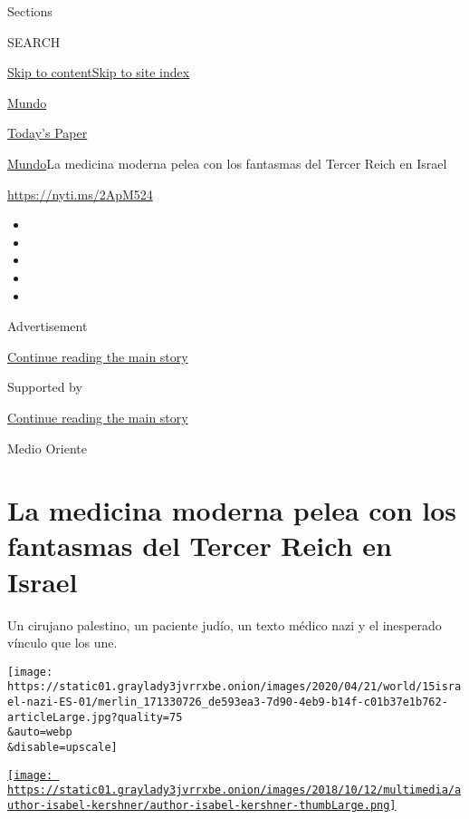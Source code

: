 Sections

SEARCH

\protect\hyperlink{site-content}{Skip to
content}\protect\hyperlink{site-index}{Skip to site index}

\href{https://www.nytimes3xbfgragh.onion/es/section/mundo}{Mundo}

\href{https://myaccount.nytimes3xbfgragh.onion/auth/login?response_type=cookie\&client_id=vi}{}

\href{https://www.nytimes3xbfgragh.onion/section/todayspaper}{Today's
Paper}

\href{/es/section/mundo}{Mundo}\textbar{}La medicina moderna pelea con
los fantasmas del Tercer Reich en Israel

\url{https://nyti.ms/2ApM524}

\begin{itemize}
\item
\item
\item
\item
\item
\end{itemize}

Advertisement

\protect\hyperlink{after-top}{Continue reading the main story}

Supported by

\protect\hyperlink{after-sponsor}{Continue reading the main story}

Medio Oriente

\hypertarget{la-medicina-moderna-pelea-con-los-fantasmas-del-tercer-reich-en-israel}{%
\section{La medicina moderna pelea con los fantasmas del Tercer Reich en
Israel}\label{la-medicina-moderna-pelea-con-los-fantasmas-del-tercer-reich-en-israel}}

Un cirujano palestino, un paciente judío, un texto médico nazi y el
inesperado vínculo que los une.

\texttt{[image: https://static01.graylady3jvrrxbe.onion/images/2020/04/21/world/15israel-nazi-ES-01/merlin\_171330726\_de593ea3-7d90-4eb9-b14f-c01b37e1b762-articleLarge.jpg?quality=75\\\&auto=webp\\\&disable=upscale]}

\href{https://www.nytimes3xbfgragh.onion/by/isabel-kershner}{\texttt{[image: https://static01.graylady3jvrrxbe.onion/images/2018/10/12/multimedia/author-isabel-kershner/author-isabel-kershner-thumbLarge.png]}}

